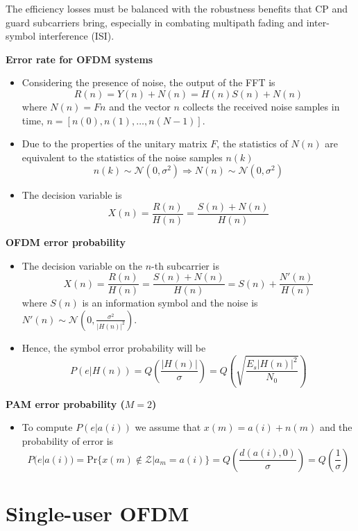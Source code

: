 The efficiency losses must be balanced with the robustness benefits that CP and guard subcarriers bring, especially in combating multipath fading and inter-symbol interference (ISI).


\textbf{Error rate for OFDM systems}
\begin{itemize}
    \item Considering the presence of noise, the output of the FFT is
    \[ R(n) = Y(n) + N(n) = H(n)S(n) + N(n) \]
    where \( N(n) = Fn \) and the vector \( n \) collects the received noise samples in time, \( n = [n(0), n(1), \ldots, n(N - 1)] \).
    
    \item Due to the properties of the unitary matrix \( F \), the statistics of \( N(n) \) are equivalent to the statistics of the noise samples \( n(k) \)
    \[ n(k) \sim \mathcal{N}(0, \sigma^2) \Rightarrow N(n) \sim \mathcal{N}(0, \sigma^2) \]
    
    \item The decision variable is 
    \[ X(n) = \frac{R(n)}{H(n)} = \frac{S(n) + N(n)}{H(n)} \]
\end{itemize}


\textbf{OFDM error probability}
\begin{itemize}
    \item The decision variable on the \(n\)-th subcarrier is
    \[ X(n) = \frac{R(n)}{H(n)} = \frac{S(n) + N(n)}{H(n)} = S(n) + \frac{N'(n)}{H(n)} \]
    where \( S(n) \) is an information symbol and the noise is \( N'(n) \sim \mathcal{N}\left(0, \frac{\sigma^2}{|H(n)|^2}\right) \).
    
    \item Hence, the symbol error probability will be
    \[ P(e|H(n)) = Q\left(\frac{|H(n)|}{\sigma}\right) = Q\left(\sqrt{\frac{E_s |H(n)|^2}{N_0}}\right) \]
\end{itemize}

\textbf{PAM error probability (\( M = 2 \))}
\begin{itemize}
    \item To compute \( P(e|a(i)) \) we assume that \( x(m) = a(i) + n(m) \) and the probability of error is
    \[ P(e|a(i)) = \text{Pr}\{x(m) \notin \mathcal{Z}|a_m = a(i)\} = Q\left(\frac{d(a(i), 0)}{\sigma}\right) = Q\left(\frac{1}{\sigma}\right) \]
\end{itemize}


\section*{Single-user OFDM}

